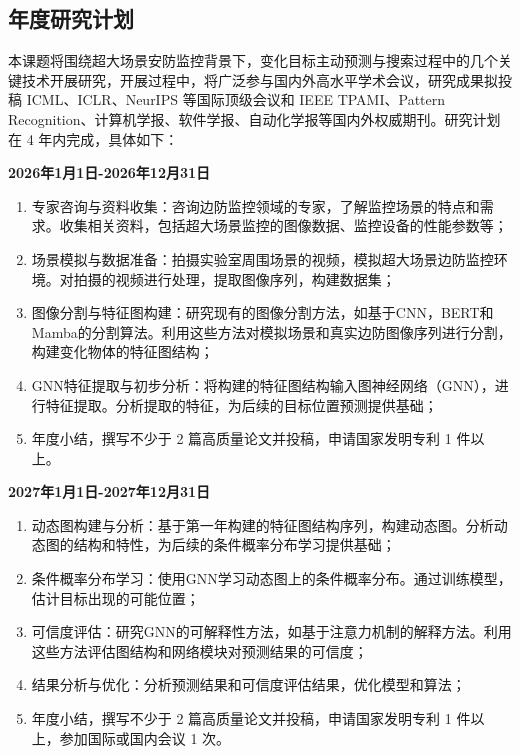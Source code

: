 \subsection{年度研究计划}
本课题将围绕超大场景安防监控背景下，变化目标主动预测与搜索过程中的几个关键技术开展研究，开展过程中，将广泛参与国内外高水平学术会议，研究成果拟投稿 ICML、ICLR、NeurIPS 等国际顶级会议和 IEEE TPAMI、Pattern Recognition、计算机学报、软件学报、自动化学报等国内外权威期刊。研究计划在 4 年内完成，具体如下：

\textbf{2026年1月1日-2026年12月31日}

\begin{enumerate}[left=30pt,label=(\arabic*),itemsep=1em]
\item 专家咨询与资料收集：咨询边防监控领域的专家，了解监控场景的特点和需求。收集相关资料，包括超大场景监控的图像数据、监控设备的性能参数等；
\item 场景模拟与数据准备：拍摄实验室周围场景的视频，模拟超大场景边防监控环境。对拍摄的视频进行处理，提取图像序列，构建数据集；
\item 图像分割与特征图构建：研究现有的图像分割方法，如基于CNN，BERT和Mamba的分割算法。利用这些方法对模拟场景和真实边防图像序列进行分割，构建变化物体的特征图结构；
\item GNN特征提取与初步分析：将构建的特征图结构输入图神经网络（GNN），进行特征提取。分析提取的特征，为后续的目标位置预测提供基础；
\item 年度小结，撰写不少于 2 篇高质量论文并投稿，申请国家发明专利 1 件以上。
\end{enumerate}

\textbf{2027年1月1日-2027年12月31日}

\begin{enumerate}[left=30pt,label=(\arabic*),itemsep=1em]
\item 动态图构建与分析：基于第一年构建的特征图结构序列，构建动态图。分析动态图的结构和特性，为后续的条件概率分布学习提供基础；
\item 条件概率分布学习：使用GNN学习动态图上的条件概率分布。通过训练模型，估计目标出现的可能位置；
\item 可信度评估：研究GNN的可解释性方法，如基于注意力机制的解释方法。利用这些方法评估图结构和网络模块对预测结果的可信度；
\item 结果分析与优化：分析预测结果和可信度评估结果，优化模型和算法；
\item 年度小结，撰写不少于 2 篇高质量论文并投稿，申请国家发明专利 1 件以上，参加国际或国内会议 1 次。
\end{enumerate}


